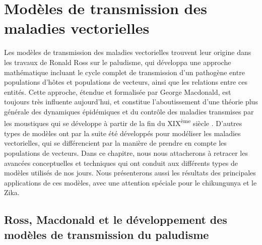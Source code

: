\chapter{Modèles de transmission des maladies vectorielles}
\chaptermark{}



Les modèles de transmission des maladies vectorielles trouvent leur origine dans les travaux de Ronald Ross sur le paludisme, qui développa une approche mathématique incluant le cycle complet de transmission d'un pathogène entre populations d'hôtes et populations de vecteurs, ainsi que les relations entre ces entités.
Cette approche, étendue et formalisée par George Macdonald, est toujours très influente aujourd'hui, et constitue l'aboutissement d'une théorie plus générale des dynamiques épidémiques et du contrôle des maladies transmises par les moustiques qui se développe à partir de la fin du XIX\textsuperscript{ème} siècle \cite{smith2012ross}.
D'autres types de modèles ont par la suite été développés pour modéliser les maladies vectorielles, qui se différencient par la manière de prendre en compte les populations de vecteurs.
Dans ce chapitre, nous nous attacherons à retracer les avancées conceptuelles et techniques qui ont conduit aux différents types de modèles utilisés de nos jours.
Nous présenterons aussi les résultats des principales applications de ces modèles, avec une attention spéciale pour le chikungunya et le Zika.

\section[Ross, Macdonald \& le paludisme]{Ross, Macdonald et le développement des modèles de transmission du paludisme}

